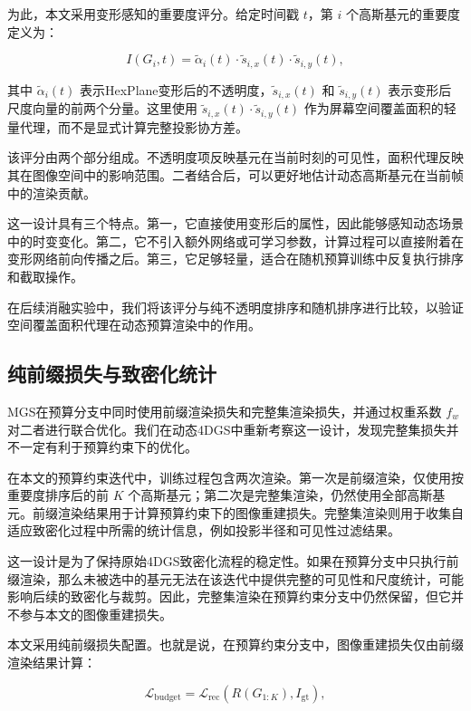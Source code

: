 \documentclass[sn-mathphys]{sn-jnl}
\begin{document}
为此，本文采用变形感知的重要度评分。给定时间戳 $t$，第 $i$ 个高斯基元的重要度定义为：

\begin{equation}
I(G_i,t)
=
\tilde{\alpha}_i(t)
\cdot
\tilde{s}_{i,x}(t)
\cdot
\tilde{s}_{i,y}(t),
\label{eq:importance}
\end{equation}

其中 $\tilde{\alpha}_i(t)$ 表示HexPlane变形后的不透明度，$\tilde{s}_{i,x}(t)$ 和 $\tilde{s}_{i,y}(t)$ 表示变形后尺度向量的前两个分量。这里使用 $\tilde{s}_{i,x}(t)\cdot \tilde{s}_{i,y}(t)$ 作为屏幕空间覆盖面积的轻量代理，而不是显式计算完整投影协方差。

该评分由两个部分组成。不透明度项反映基元在当前时刻的可见性，面积代理反映其在图像空间中的影响范围。二者结合后，可以更好地估计动态高斯基元在当前帧中的渲染贡献。

这一设计具有三个特点。第一，它直接使用变形后的属性，因此能够感知动态场景中的时变变化。第二，它不引入额外网络或可学习参数，计算过程可以直接附着在变形网络前向传播之后。第三，它足够轻量，适合在随机预算训练中反复执行排序和截取操作。

在后续消融实验中，我们将该评分与纯不透明度排序和随机排序进行比较，以验证空间覆盖面积代理在动态预算渲染中的作用。

\subsection{纯前缀损失与致密化统计}
\label{sec:loss}

MGS在预算分支中同时使用前缀渲染损失和完整集渲染损失，并通过权重系数 $f_w$ 对二者进行联合优化。我们在动态4DGS中重新考察这一设计，发现完整集损失并不一定有利于预算约束下的优化。

在本文的预算约束迭代中，训练过程包含两次渲染。第一次是前缀渲染，仅使用按重要度排序后的前 $K$ 个高斯基元；第二次是完整集渲染，仍然使用全部高斯基元。前缀渲染结果用于计算预算约束下的图像重建损失。完整集渲染则用于收集自适应致密化过程中所需的统计信息，例如投影半径和可见性过滤结果。

这一设计是为了保持原始4DGS致密化流程的稳定性。如果在预算分支中只执行前缀渲染，那么未被选中的基元无法在该迭代中提供完整的可见性和尺度统计，可能影响后续的致密化与裁剪。因此，完整集渲染在预算约束分支中仍然保留，但它并不参与本文的图像重建损失。

本文采用纯前缀损失配置。也就是说，在预算约束分支中，图像重建损失仅由前缀渲染结果计算：

\begin{equation}
\mathcal{L}_{\mathrm{budget}}
=
\mathcal{L}_{\mathrm{rec}}(R(G_{1:K}), I_{\mathrm{gt}}),
\label{eq:budget_loss}
\end{equation}
\end{document}
